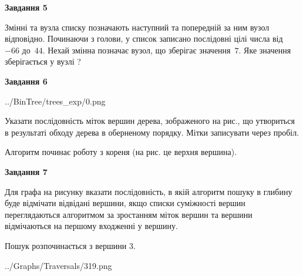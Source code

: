 \documentclass[12pt, ukrainian]{article}
\begin{document}
{\begin {large}
{\begin {center}\textbf{Завдання 5}\end {center}}\par
Змінні  та  вузла списку позначають наступний та попередній за ним вузол відповідно. Починаючи з голови, у список записано послідовні цілі числа від~$-66$ до~$44$. Нехай змінна  позначає вузол, що зберігає значення~$7$.
Яке значення зберігається у вузлі  ?\par
\newpage

{\begin {center}\textbf{Завдання 6}\end {center}}\par

\begin{center}
	{../BinTree/trees_exp/0.png}
\end{center}
Указати послідовність міток вершин дерева, зображеного на рис., що утвориться в результаті обходу дерева в оберненому порядку. Мітки записувати через пробіл.\par Алгоритм починає роботу з кореня (на рис. це верхня вершина).\par
\newpage

{\begin {center}\textbf{Завдання 7}\end {center}}\par
Для графа на рисунку вказати послідовність, в якій алгоритм пошуку в глибину буде відмічати відвідані вершини, якщо списки суміжності вершин переглядаються алгоритмом за зростанням міток вершин та вершини відмічаються на першому вход\-женні у вершину.\par
Пошук розпочинається з вершини 3.\par

\begin{center}
	{../Graphs/Traversals/319.png}
\end{center}\par
\newpage


\end{large}}
\end{document}
